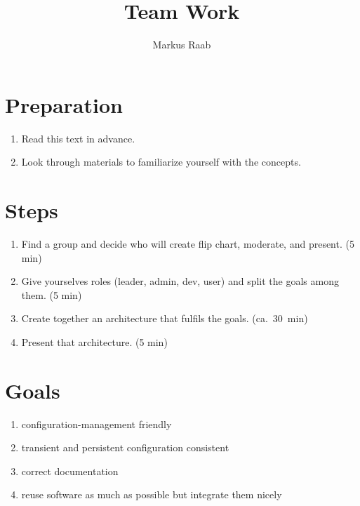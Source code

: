 



\setcounter{chapter}{1} %


\title{Team Work}
\author{Markus Raab}




\maketitle
\doclicenseThis

\section{Preparation}

\begin{enumerate}
	\item Read this text in advance.
	\item Look through materials to familiarize yourself with the concepts.
\end{enumerate}


\section{Steps}

\begin{enumerate}
	\item Find a group and decide who will create flip chart, moderate, and present. (5 min)
	\item Give yourselves roles (leader, admin, dev, user) and split the goals among them. (5 min)
	\item Create together an architecture that fulfils the goals. (ca.~30~min)
	\item Present that architecture. (5 min)
\end{enumerate}

\section{Goals}


\begin{enumerate}
	\item configuration-management friendly
	\item transient and persistent configuration consistent
	\item correct documentation
	\item reuse software as much as possible but integrate them nicely
\end{enumerate}

